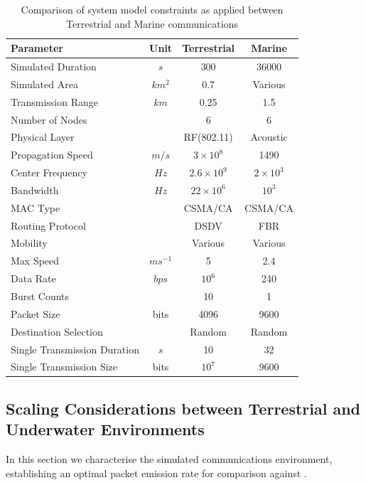 \documentclass[runningheads,a4paper]{llncs}
\begin{document}
\begin{table}[h]
  \caption{Comparison of system model constraints as applied between Terrestrial and Marine communications} \label{tab:sysconstraints}
  \begin{center}
    \setlength{\tabcolsep}{8pt}
    \begin{tabular}{lccc}
      \toprule
      Parameter & Unit & Terrestrial & Marine \\
      \midrule
      Simulated Duration & $s$ & 300 & 36000\\
      Simulated Area & $km^2$ & 0.7 & Various \\
      Transmission Range & $km$ & 0.25 & 1.5 \\
      Number of Nodes & & 6 & 6 \\
      Physical Layer & & RF(802.11) & Acoustic\\
      Propagation Speed& $m/s$ & $3\times10^8$ & 1490\\
      Center Frequency& $Hz$ & $2.6\times10^9$ & $2 \times 10^3$ \\
      Bandwidth& $Hz$ & $22\times10^6$ & $10^3$\\
      MAC Type & & CSMA/CA & CSMA/CA\\
      Routing Protocol & & DSDV & FBR \\
      Mobility & & Various & Various \\
      Max Speed & $ms^{-1}$ & 5 & 2.4 \\
      Data Rate & $bps$ & $10^6$ & 240 \\
      Burst Counts & & 10 & 1 \\
      Packet Size & bits & 4096 &  9600 \\
      Destination Selection & & Random & Random\\
      Single Transmission Duration & $s$ & 10 & 32 \\
      Single Transmission Size & bits & $10^7$ & $9600$ \\
      \bottomrule
    \end{tabular}
    \setlength{\tabcolsep}{6pt}
  \end{center}
\end{table}


\subsection{Scaling Considerations between Terrestrial and Underwater Environments}

In this section we characterise the simulated communications environment, establishing an optimal packet emission rate for comparison against \cite{Guo11}.
\end{document}
